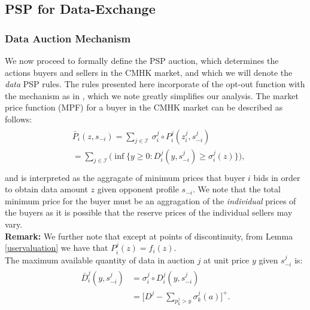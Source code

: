 \documentclass[sigconf, anonymous]{acmart}
\newcommand{\vs}{\varsigma}
\newcommand{\mcI}{\mathcal{I}}
\newcommand{\g}{\sigma}
\theoremstyle{definition}
\begin{document}
\subsection{PSP for Data-Exchange}

\subsubsection{Data Auction Mechanism}\label{datamechanism}
We now proceed to formally define the PSP auction, which determines the actions 
buyers and sellers in the CMHK market, and which we will denote the \emph{data}
PSP rules. The rules presented here incorporate of the opt-out function with the
mechanism as in \cite{lazar}, which we note greatly simplifies our
analysis. 
The market price function (MPF) for a buyer in the CMHK market
can be described as follows:
\begin{align}\label{dataprice}
\begin{split}
    &\bar{P}_i(z, s_{-i}) =\displaystyle\sum_{j\in\mcI} \ \g_i^j \circ P_i^j(z_i^j,
s_{-i}^j) \\
    &= \sum_{j\in\mcI}\bigg(\inf\bigg\lbrace y\ge 0 : 
    {D_i^j}(y,s_{-i}^j) \ge \g_i^j(z) \bigg\rbrace \bigg),\\
\end{split}
\end{align}
and is interpreted as the aggragate of minimum prices that buyer $i$ bids in
order to obtain
data amount $z$ given opponent profile $s_{-i}$. We note that
the total minimum price for the buyer must be an aggragation of the
\emph{individual} prices of the buyers as it is possible that the reserve prices
of the individual sellers may vary.\\
\textbf{Remark:} We further note that except at points of discontinuity, from
Lemma \ref{uservaluation} we have that $P_i^j(z) = f_i(z)$. \\
The maximum available quantity of data in auction
$j$ at unit price $y$ given $s_{-i}^j$ is: 
\begin{align}
\begin{split}\label{datacomposed}
    \bar{D}_i^j(y,s_{-i}^j) &= \g_i^j \circ D_i^j( y,s_{-i}^j)\\
    &= \bigg\lbrack D^j - \sum_{p_k^j> y} \g_k^j(a)\bigg\rbrack^+.
\end{split}
\end{align}
\end{document}
